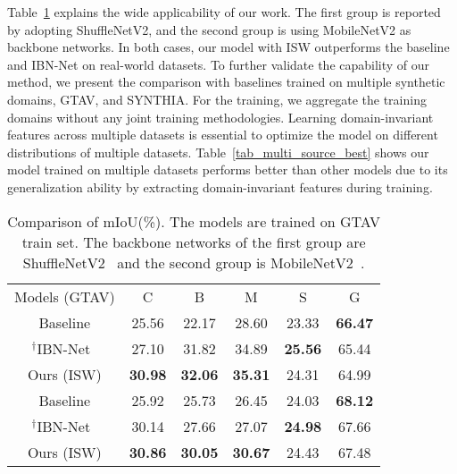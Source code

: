 \documentclass[final]{latex/cvpr}
\newcommand{\drule}{\specialrule{0.2pt}{1pt}{1pt}\specialrule{0.2pt}{0pt}{\belowrulesep}}
\begin{document}
Table~\ref{tab_various_backbone_cityscapes} explains the wide applicability of our work. The first group is reported by adopting ShuffleNetV2, and the second group is using MobileNetV2 as backbone networks. In both cases, our model with ISW outperforms the baseline and IBN-Net on real-world datasets.
To further validate the capability of our method, we present the comparison with baselines trained on multiple synthetic domains, GTAV, and SYNTHIA. For the training, we aggregate the training domains without any joint training methodologies.
Learning domain-invariant features across multiple datasets is essential to optimize the model on different distributions of multiple datasets. Table~\ref{tab_multi_source_best} shows our model trained on multiple datasets performs better than other models due to its generalization ability by extracting domain-invariant features during training.


\begin{table}[t!]
\vspace*{-0.0cm}
\begin{center}
\setlength\tabcolsep{5.2pt}
\footnotesize
\begin{tabular}{c|c|c|c|c||c}
\toprule
Models (GTAV) & C & B & M & S & G \\
\drule
Baseline              & 25.56      & 22.17      & 28.60      & 23.33      & \textbf{66.47} \\
\midrule
$^\dagger$IBN-Net~\cite{pan2018two} & 27.10     & 31.82 & 34.89      & \textbf{25.56}      & 65.44      \\
\midrule
Ours (ISW)                & \textbf{30.98} & \textbf{32.06}      & \textbf{35.31} & 24.31 & 64.99      \\
\toprule
Baseline              & 25.92      & 25.73      & 26.45  & 24.03      & \textbf{68.12} \\
\midrule
$^\dagger$IBN-Net~\cite{pan2018two} & 30.14      & 27.66      & 27.07      & \textbf{24.98}      & 67.66      \\
\midrule
Ours (ISW)              & \textbf{30.86} & \textbf{30.05} & \textbf{30.67} & 24.43 & 67.48      \\
\bottomrule
\end{tabular}
\end{center}
\vspace*{-0.15cm}
\caption{Comparison of mIoU(\%). The models are trained on GTAV train set. The backbone networks of the first group are ShuffleNetV2~\cite{ma2018shufflenet} and the second group is MobileNetV2~\cite{sandler2018mobilenetv2}.}\label{tab_various_backbone_cityscapes}
\vspace*{-0.55cm}
\end{table}
\end{document}

